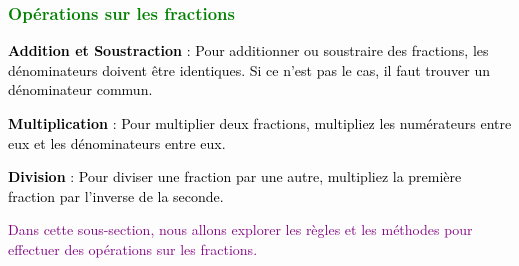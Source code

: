 \documentclass{article}
\begin{document}
\subsubsection{\textcolor{green}{Opérations sur les fractions}}

\vspace{0.35cm}

\begin{tcolorbox}[colback=cyan!10!white, colframe=red!75!black, title=\textcolor{white}{Définitions et Règles}, 
                  sharp corners=southwest]
    \textcolor{black}{\textbf{Addition et Soustraction} : 
    Pour additionner ou soustraire des fractions, les dénominateurs doivent être identiques. Si ce n'est pas le cas, il faut trouver un dénominateur commun.}
    
    \vspace{5pt}
    
    \textcolor{black}{\textbf{Multiplication} :
    Pour multiplier deux fractions, multipliez les numérateurs entre eux et les dénominateurs entre eux.}
    
    \vspace{5pt}
    
    \textcolor{black}{\textbf{Division} :
    Pour diviser une fraction par une autre, multipliez la première fraction par l'inverse de la seconde.}
\end{tcolorbox}

\vspace{0.2cm}

\textcolor{purple}{Dans cette sous-section, nous allons explorer les règles et les méthodes pour effectuer des opérations sur les fractions.}

\vspace{0.2cm}
\end{document}

